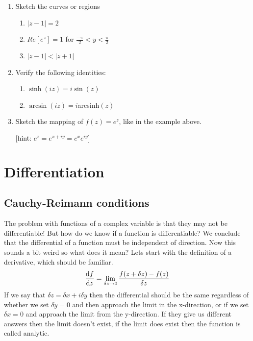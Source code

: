 \begin{examples}
	\begin{enumerate}
		\item Sketch the curves or regions
		\begin{enumerate}
			\item $|z-1|=2$
			\item $Re[e^z]=1$ for $\frac{-\pi}{2} < y < \frac{\pi}{2}$
			\item $|z-1|<|z+1|$
		\end{enumerate}
		\item Verify the following identities:
		\begin{enumerate}
			\item $\sinh(iz)=i\sin(z)$
			\item $\arcsin(iz)=i$arcsinh$(z)$
		\end{enumerate}
		\item Sketch the mapping of $f(z)=e^z$, like in the example above.
		
		 [hint: $e^z=e^{x+iy}=e^xe^{iy}$]
	\end{enumerate}
\end{examples}
%
%
%
\section{Differentiation}
\subsection{Cauchy-Reimann conditions}
The problem with functions of a complex variable is that they may not be differentiable!
 But how do we know if a function is differentiable? 
 We conclude that the differential of a function must be independent of direction. 
 Now this sounds a bit weird so what does it mean?
  Lets start with the definition of a derivative, which should be familiar.
%
\begin{equation*}
\frac{\mathop{}\!\mathrm{d} f}{\mathop{}\!\mathrm{d} z}=\lim_{\delta z\to 0}\frac{f(z+\delta z)-f(z)}{\delta z}
\end{equation*}
%
If we say that $\delta z=\delta x + i\delta y$ then the differential should be the same regardless of whether we set $\delta y=0$ and then approach the limit in the x-direction, or if we set $\delta x=0$ and approach the limit from the y-direction.
 If they give us different answers then the limit doesn't exist, if the limit does exist then the function is called analytic.
 
